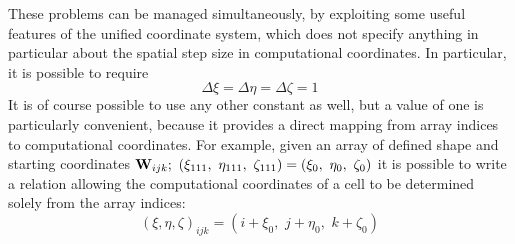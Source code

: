 These problems can be managed simultaneously, by exploiting some useful features of the unified coordinate system, which does not specify anything in particular about the spatial step size in computational coordinates. In particular, it is possible to require 
\[\Delta \xi  = \Delta \eta  = \Delta \zeta  = 1\]
It is of course possible to use any other constant as well, but a value of one is particularly convenient, because it provides a direct mapping from array indices to computational coordinates. For example, given an array of defined shape and starting coordinates 
${{\bf{W}}_{ijk}};\,\,\left( {{\xi _{111}},\,\,{\eta _{111}},\,\,{\zeta _{111}}} \right) = \left( {{\xi _0},\,\,{\eta _0},\,\,{\zeta _0}} \right)$
it is possible to write a relation allowing the computational coordinates of a cell to be determined solely from the array indices:
\begin{equation}
\label{eq:better-bcs}
{\left( {\xi ,\eta ,\zeta } \right)_{ijk}} = \left( {i + {\xi _0},\,\,j + {\eta _0},\,\,k + {\zeta _0}} \right)
\end{equation}
